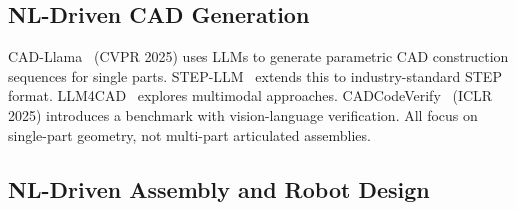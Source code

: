 \documentclass[conference]{IEEEtran}
\begin{document}
\subsection{NL-Driven CAD Generation}
CAD-Llama~\cite{cadllama2025} (CVPR 2025) uses LLMs to generate parametric CAD construction sequences for single parts. STEP-LLM~\cite{stepllm2026} extends this to industry-standard STEP format. LLM4CAD~\cite{llm4cad2025} explores multimodal approaches. CADCodeVerify~\cite{cadcodeverify2025} (ICLR 2025) introduces a benchmark with vision-language verification. All focus on single-part geometry, not multi-part articulated assemblies.

\subsection{NL-Driven Assembly and Robot Design}
\end{document}
